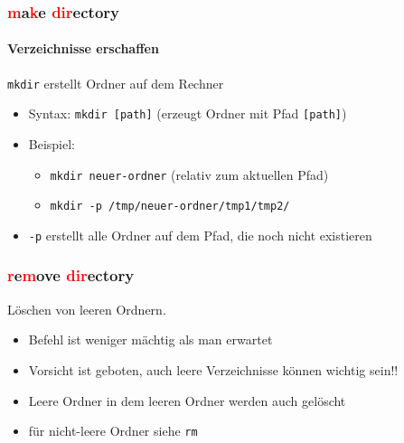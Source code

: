 \documentclass[12pt,utf8]{beamer}
\begin{document}
\begin{frame}
\frametitle{\textcolor{red}{m}a\textcolor{red}{k}e \textcolor{red}{dir}ectory}
\framesubtitle{\textcolor{ownDarkOr}{Verzeichnisse erschaffen}}
\texttt{mkdir} erstellt Ordner auf dem Rechner
\begin{itemize}
	\item Syntax: \texttt{mkdir [path]}   (erzeugt Ordner mit Pfad \texttt{[path]})
	\item Beispiel:
	\begin{itemize}[<+->]
		\item \texttt{mkdir neuer-ordner}    (relativ zum aktuellen Pfad)
		\item \texttt{mkdir -p /tmp/neuer-ordner/tmp1/tmp2/}
	\end{itemize}
	\item \texttt{-p}   erstellt alle Ordner auf dem Pfad, die noch nicht existieren
\end{itemize}
\end{frame}

\begin{frame}
\frametitle{\textcolor{red}{r}e\textcolor{red}{m}ove \textcolor{red}{dir}ectory}
Löschen von leeren Ordnern.
\begin{itemize}
	\item Befehl ist weniger mächtig als man erwartet
	\item Vorsicht ist geboten, auch leere Verzeichnisse können wichtig sein!!
	\item Leere Ordner in dem leeren Ordner werden auch gelöscht
	\item für nicht-leere Ordner siehe \texttt{rm}
\end{itemize}
\end{frame}

\end{document}
